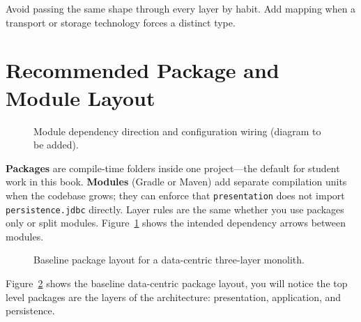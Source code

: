 Avoid passing the same shape through every layer by habit. Add mapping when a transport or storage technology forces a distinct type.

\section{Recommended Package and Module Layout}
\label{sec:three_layered_package_layout}

\begin{figure}[htbp]
\centering
{}
\caption{Module dependency direction and configuration wiring (diagram to be added).}
\label{fig:three_layered_module_deps}
\end{figure}

\textbf{Packages} are compile-time folders inside one project---the default for student work in this book. \textbf{Modules} (Gradle or Maven) add separate compilation units when the codebase grows; they can enforce that \texttt{presentation} does not import \texttt{persistence.jdbc} directly. Layer rules are the same whether you use packages only or split modules. Figure~\ref{fig:three_layered_module_deps} shows the intended dependency arrows between modules.

\begin{figure}[htbp]
\centering
\begin{minipage}{0.8\textwidth}
\end{minipage}
\caption{Baseline package layout for a data-centric three-layer monolith.}
\label{fig:three_layered_package_layout}
\end{figure}

Figure~\ref{fig:three_layered_package_layout} shows the baseline data-centric package layout, you will notice the top level packages are the layers of the architecture: presentation, application, and persistence.

